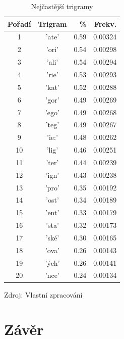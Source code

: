 \documentclass[a4paper, twoside, 12pt, czech]{article}
\begin{document}
\begin{table}[htpb]
\begin{minipage}{0.48\textwidth}
\centering
\caption{Nejčastější trigramy}
\vspace{0.5cm}
\label{tab:trigramy}
\begin{tabular}{|c|c|r|r|}
\hline
\textbf{Pořadí} & \textbf{Trigram} & \textbf{\%} & \textbf{Frekv.} \\ 
\hline
1  & 'ate' & 0.59 & 0.00324 \\ \hline
2  & 'ori' & 0.54 & 0.00298 \\ \hline
3  & 'ali' & 0.54 & 0.00294 \\ \hline
4  & 'rie' & 0.53 & 0.00293 \\ \hline
5  & 'kat' & 0.52 & 0.00288 \\ \hline
6  & 'gor' & 0.49 & 0.00269 \\ \hline
7  & 'ego' & 0.49 & 0.00268 \\ \hline
8  & 'teg' & 0.49 & 0.00267 \\ \hline
9  & 'ie:' & 0.48 & 0.00262 \\ \hline
10 & 'lig' & 0.46 & 0.00251 \\ \hline
11 & 'ter' & 0.44 & 0.00239 \\ \hline
12 & 'ign' & 0.43 & 0.00238 \\ \hline
13 & 'pro' & 0.35 & 0.00192 \\ \hline
14 & 'ost' & 0.34 & 0.00189 \\ \hline
15 & 'ent' & 0.33 & 0.00179 \\ \hline
16 & 'sta' & 0.32 & 0.00173 \\ \hline
17 & 'ské' & 0.30 & 0.00165 \\ \hline
18 & 'ova' & 0.26 & 0.00143 \\ \hline
19 & 'ých' & 0.26 & 0.00141 \\ \hline
20 & 'nce' & 0.24 & 0.00134 \\ \hline
\end{tabular}
\end{minipage}\hfill

\vspace{0.5cm}
\small{Zdroj: Vlastní zpracování}
\end{table}

\newpage
\section{Závěr}
\end{document}
